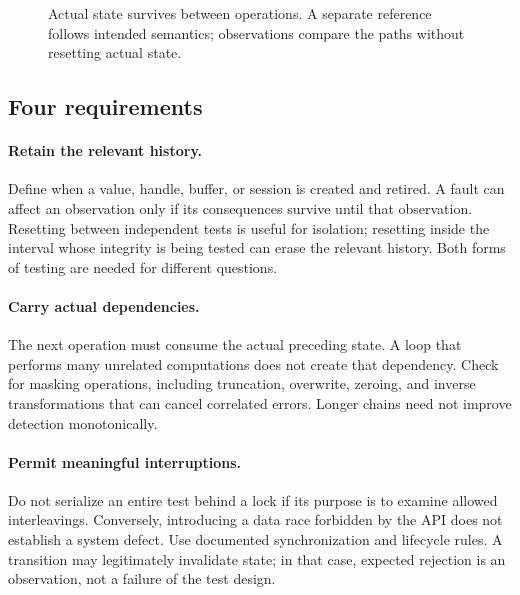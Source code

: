 \documentclass[10pt,twocolumn,letterpaper]{article}
\begin{document}
\begin{figure}[t]
\centering
{}
\caption{Actual state survives between operations. A separate reference follows intended semantics; observations compare the paths without resetting actual state.}
\label{fig:contract}
\end{figure}

\subsection{Four requirements}
\paragraph{Retain the relevant history.}
Define when a value, handle, buffer, or session is created and retired. A fault can affect an observation only if its consequences survive until that observation. Resetting between independent tests is useful for isolation; resetting inside the interval whose integrity is being tested can erase the relevant history. Both forms of testing are needed for different questions.

\paragraph{Carry actual dependencies.}
The next operation must consume the actual preceding state. A loop that performs many unrelated computations does not create that dependency. Check for masking operations, including truncation, overwrite, zeroing, and inverse transformations that can cancel correlated errors. Longer chains need not improve detection monotonically.

\paragraph{Permit meaningful interruptions.}
Do not serialize an entire test behind a lock if its purpose is to examine allowed interleavings. Conversely, introducing a data race forbidden by the API does not establish a system defect. Use documented synchronization and lifecycle rules. A transition may legitimately invalidate state; in that case, expected rejection is an observation, not a failure of the test design.
\end{document}
